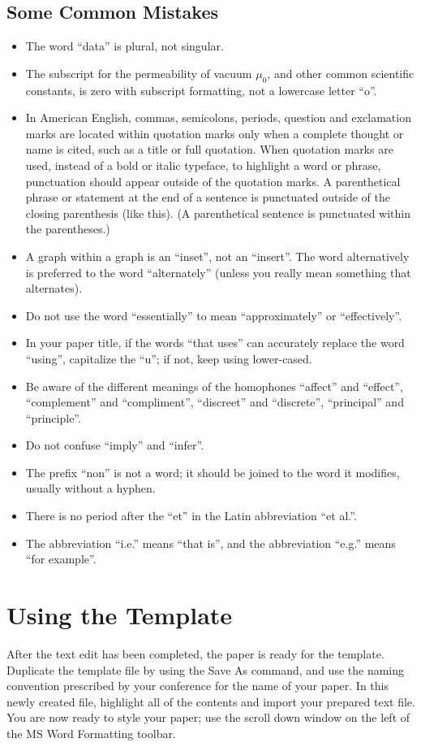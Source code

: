 \documentclass[a4paper,conference]{IEEEtran}
\begin{document}
\subsection{Some Common Mistakes}
\begin{itemize}
    \item The word “data” is plural, not singular.
    \item The subscript for the permeability of vacuum \(\mu_0\), and other common scientific constants, is zero with subscript formatting, not a lowercase letter “o”.
    \item In American English, commas, semicolons, periods, question and exclamation marks are located within quotation marks only when a complete thought or name is cited, such as a title or full quotation. When quotation marks are used, instead of a bold or italic typeface, to highlight a word or phrase, punctuation should appear outside of the quotation marks. A parenthetical phrase or statement at the end of a sentence is punctuated outside of the closing parenthesis (like this). (A parenthetical sentence is punctuated within the parentheses.)
    \item A graph within a graph is an “inset”, not an “insert”. The word alternatively is preferred to the word “alternately” (unless you really mean something that alternates).
    \item Do not use the word “essentially” to mean “approximately” or “effectively”.
    \item In your paper title, if the words “that uses” can accurately replace the word “using”, capitalize the “u”; if not, keep using lower-cased.
    \item Be aware of the different meanings of the homophones “affect” and “effect”, “complement” and “compliment”, “discreet” and “discrete”, “principal” and “principle”.
    \item Do not confuse “imply” and “infer”.
    \item The prefix “non” is not a word; it should be joined to the word it modifies, usually without a hyphen.
    \item There is no period after the “et” in the Latin abbreviation “et al.”.
    \item The abbreviation “i.e.” means “that is”, and the abbreviation “e.g.” means “for example”.
\end{itemize}

\section{Using the Template}
After the text edit has been completed, the paper is ready for the template. Duplicate the template file by using the Save As command, and use the naming convention prescribed by your conference for the name of your paper. In this newly created file, highlight all of the contents and import your prepared text file. You are now ready to style your paper; use the scroll down window on the left of the MS Word Formatting toolbar.
\end{document}
